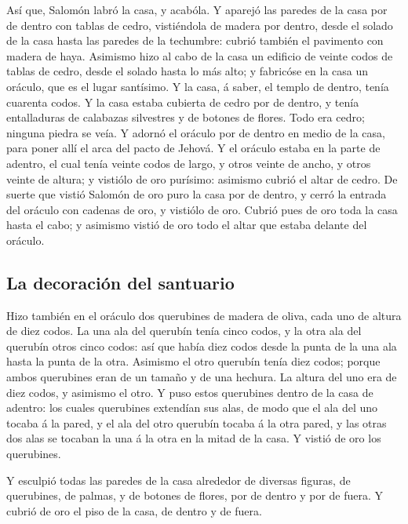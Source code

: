  Así que, Salomón labró la casa, y acabóla.  Y
aparejó las paredes de la casa por de dentro con tablas de cedro,
vistiéndola de madera por dentro, desde el solado de la casa hasta las
paredes de la techumbre: cubrió también el pavimento con madera de haya.
 Asimismo hizo al cabo de la casa un edificio de veinte
codos de tablas de cedro, desde el solado hasta lo más alto; y fabricóse
en la casa un oráculo, que es el lugar santísimo.  Y la
casa, á saber, el templo de dentro, tenía cuarenta codos. 
Y la casa estaba cubierta de cedro por de dentro, y tenía entalladuras
de calabazas silvestres y de botones de flores. Todo era cedro; ninguna
piedra se veía.  Y adornó el oráculo por de dentro en medio
de la casa, para poner allí el arca del pacto de Jehová.  Y
el oráculo estaba en la parte de adentro, el cual tenía veinte codos de
largo, y otros veinte de ancho, y otros veinte de altura; y vistiólo de
oro purísimo: asimismo cubrió el altar de cedro.  De suerte
que vistió Salomón de oro puro la casa por de dentro, y cerró la entrada
del oráculo con cadenas de oro, y vistiólo de oro.  Cubrió
pues de oro toda la casa hasta el cabo; y asimismo vistió de oro todo el
altar que estaba delante del oráculo.

\hypertarget{la-decoraciuxf3n-del-santuario}{%
\subsection{La decoración del
santuario}\label{la-decoraciuxf3n-del-santuario}}

 Hizo también en el oráculo dos querubines de madera de
oliva, cada uno de altura de diez codos.  La una ala del
querubín tenía cinco codos, y la otra ala del querubín otros cinco
codos: así que había diez codos desde la punta de la una ala hasta la
punta de la otra.  Asimismo el otro querubín tenía diez
codos; porque ambos querubines eran de un tamaño y de una hechura.
 La altura del uno era de diez codos, y asimismo el otro.
 Y puso estos querubines dentro de la casa de adentro: los
cuales querubines extendían sus alas, de modo que el ala del uno tocaba
á la pared, y el ala del otro querubín tocaba á la otra pared, y las
otras dos alas se tocaban la una á la otra en la mitad de la casa.
 Y vistió de oro los querubines.

 Y esculpió todas las paredes de la casa alrededor de
diversas figuras, de querubines, de palmas, y de botones de flores, por
de dentro y por de fuera.  Y cubrió de oro el piso de la
casa, de dentro y de fuera.

